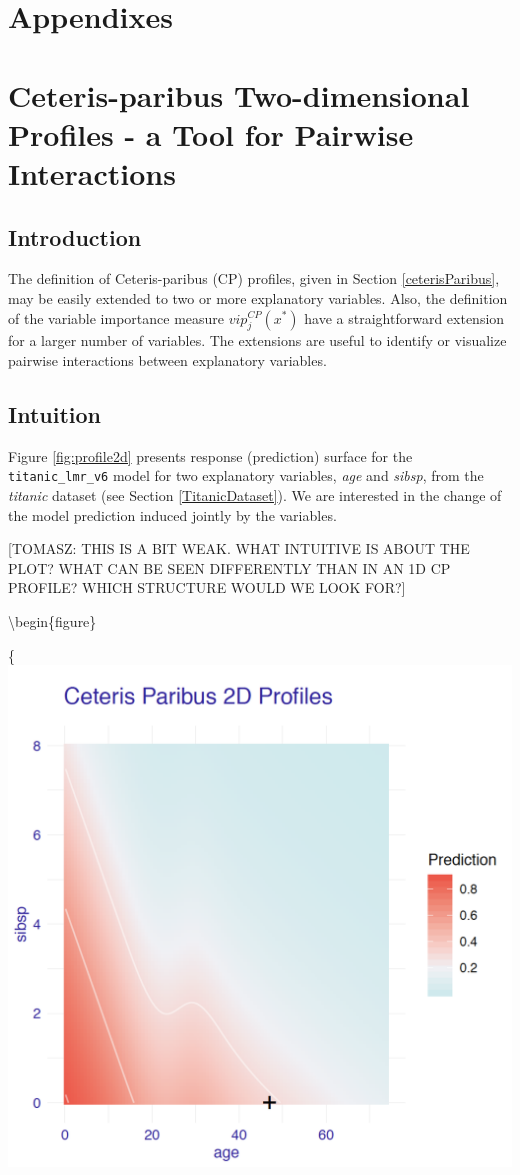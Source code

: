\documentclass[12pt,]{krantz}
\begin{document}
\hypertarget{appendixes}{%
\section*{Appendixes}\label{appendixes}}

\hypertarget{ceterisParibus2d}{%
\section{Ceteris-paribus Two-dimensional Profiles - a Tool for Pairwise Interactions}\label{ceterisParibus2d}}

\hypertarget{ceterisParibus2dIntro}{%
\subsection{Introduction}\label{ceterisParibus2dIntro}}

The definition of Ceteris-paribus (CP) profiles, given in Section \ref{ceterisParibus}, may be easily extended to two or more explanatory variables. Also, the definition of the variable importance measure \(vip^{CP}_j(x^*)\) have a straightforward extension for a larger number of variables. The extensions are useful to identify or visualize pairwise interactions between explanatory variables.

\hypertarget{ceterisParibus2dIntuition}{%
\subsection{Intuition}\label{ceterisParibus2dIntuition}}

Figure \ref{fig:profile2d} presents response (prediction) surface for the \texttt{titanic\_lmr\_v6} model for two explanatory variables, \emph{age} and \emph{sibsp}, from the \emph{titanic} dataset (see Section \ref{TitanicDataset}). We are interested in the change of the model prediction induced jointly by the variables.

{[}TOMASZ: THIS IS A BIT WEAK. WHAT INTUITIVE IS ABOUT THE PLOT? WHAT CAN BE SEEN DIFFERENTLY THAN IN AN 1D CP PROFILE? WHICH STRUCTURE WOULD WE LOOK FOR?{]}

\textbackslash{}begin\{figure\}

\{\centering \includegraphics[width=0.7\linewidth]{figure/profile_2d}
\end{document}

